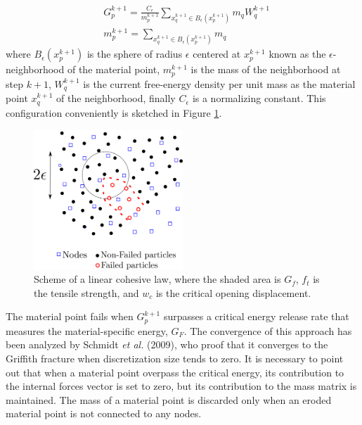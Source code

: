 \documentclass[preprint,12pt,a4paper]{elsarticle}
\begin{document}
\begin{align}
  \label{eq:energy-release-EE}
&G_p^{k+1} = \frac{C_{\epsilon}}{m_p^{k+1}}  \sum_{x_q^{k+1} \in
  B_{\epsilon}(x_p^{k+1})} m_q W_q^{k+1}\\
&m_p^{k+1} =  \sum_{x_q^{k+1} \in
  B_{\epsilon}(x_p^{k+1})} m_q  
\end{align}
where $B_{\epsilon}(x_p^{k+1})$ is the sphere of radius $\epsilon$
centered at $x_p^{k+1}$ known as the $\epsilon$-neighborhood of the
material point, $m_p^{k+1}$ is the mass of the neighborhood at step
$k+1$, $W_q^{k+1}$ is the current free-energy density per unit mass as
the material point $x_q^{k+1}$ of the neighborhood, finally
$C_{\epsilon}$ is a normalizing constant. This configuration
conveniently is sketched in Figure \ref{fig:Failed-particles}.
\begin{figure}
  \centering
  \includegraphics[width=0.5\textwidth]{Figures/Particle-failed}
  \caption{Scheme of a linear cohesive law, where the shaded area is
    $G_f$, $f_t$ is the tensile strength, and $w_c$ is the critical
    opening displacement.}
  \label{fig:Failed-particles}
\end{figure}
The material point fails when $G_p^{k+1}$ surpasses a critical energy
release rate that measures the material-specific energy, $G_F$. The
convergence of this approach has been analyzed by Schmidt {\it et al.}
(2009)\cite{Schmidt_2009}, who proof that it converges to the Griffith
fracture when discretization size tends to zero. It is necessary to
point out that when a material point overpass the critical energy, its
contribution to the internal forces vector  is set to zero, but its
contribution to the mass matrix is maintained. The mass of a material
point is discarded only when an eroded material point is not connected
to any nodes.\\
\end{document}
